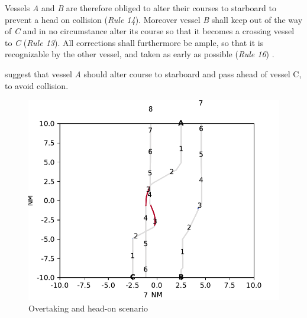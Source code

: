 Vessels \textit{A} and \textit{B} are therefore obliged to alter their courses to starboard to prevent a head on collision (\textit{Rule 14}). Moreover vessel \textit{B} shall keep out of the way of \textit{C}  and in no circumstance alter its course so that it becomes a crossing vessel to \textit{C} (\textit{Rule 13}). All corrections shall furthermore be ample, so that it is recognizable by the other vessel, and taken as early as possible (\textit{Rule 16}) \cite{ecolreg_overtaking-and-head-on}.

\textcite{ecolreg_overtaking-and-head-on} suggest that vessel \textit{A} should alter course to starboard and pass ahead of vessel C,  to avoid collision.

\begin{figure}[h]
    \centering
    \includegraphics[width=\textwidth,height=0.75\textheight,keepaspectratio]{Figures/Scenario/overtaking-and-head-on-res.pdf}
    \caption{Overtaking and head-on scenario  }
    \label{fig:overtaking-and-head-on-res}
\end{figure}

